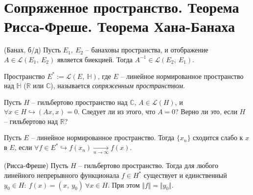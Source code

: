 \section{Сопряженное пространство. Теорема Рисса-Фреше. Теорема Хана-Банаха}
\begin{theorem}
(Банах, б/д) Пусть $\displaystyle E_{1} ,\ E_{2}$ -- банаховы пространства, и отображение $\displaystyle A\in \mathcal{L}( E_{1} ,\ E_{2})$ является биекцией. Тогда $\displaystyle A^{-1} \in \mathcal{L}( E_{2} ,\ E_{1})$.
\end{theorem}
\begin{definition}
Пространство $\displaystyle E^{*} :=\mathcal{L}( E,\ \mathbb{H})$, где $\displaystyle E$ -- линейное нормированное пространство над $\displaystyle \mathbb{H}$ ($\displaystyle \mathbb{R}$ или $\displaystyle \mathbb{C}$), называется \textit{сопряженным пространством}.
\end{definition}
\begin{exercise}
Пусть $\displaystyle H$ -- гильбертово пространство над $\displaystyle \mathbb{C}$, $\displaystyle A\in \mathcal{L}( H)$, и $\displaystyle \forall x\in H\hookrightarrow ( Ax,x) =0$. Следует ли из этого, что $\displaystyle A=0$? Верно ли это, если $\displaystyle H$ -- гильбертово над $\displaystyle \mathbb{R}$? 
\end{exercise}
\begin{definition}
Пусть $\displaystyle E$ -- линейное нормированное пространство. Тогда $\displaystyle \{x_{n}\}$ сходится слабо к $\displaystyle x$ в $\displaystyle E$, если $\displaystyle \forall f\in E^{*} \hookrightarrow f( x_{n})\xrightarrow[n\rightarrow \infty ]{} f( x)$.
\end{definition}
\begin{theorem}
(Рисса-Фреше) Пусть $\displaystyle H$ -- гильбертово пространство. Тогда для любого линейного непрерывного функционала $\displaystyle f\in H^{*}$ существует и единственный $\displaystyle y_{0} \in H:\ f( x) =( x,\ y_{0}) \ \forall x\in H$. При этом $\displaystyle \Vert f\Vert =\Vert y_{0}\Vert $.
\end{theorem}
